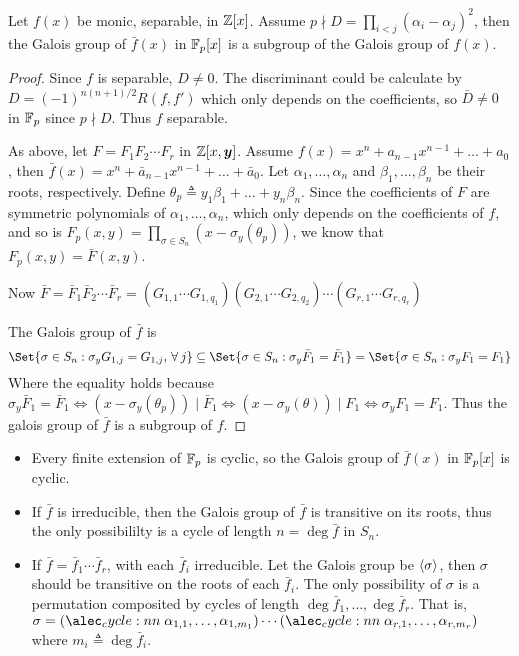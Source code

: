 \begin{theorem}
  Let $f(x)$ be monic, separable, in $\mathbb{Z}[x]$. Assume $p \nmid D = \prod_{i < j} (\alpha_i - \alpha_j)^2$,
  then the Galois group of $\bar{f}(x)$ in $\mathbb{F}_p[x]$ is a subgroup of the Galois group of $f(x)$.

  \begin{proof}
    Since $f$ is separable, $D \neq 0$. The discriminant could be calculate
    by $D = (-1)^{n(n+1)/2} R(f, f')$ which only depends on the coefficients,
    so $\bar{D} \neq 0$ in $\mathbb{F}_p$ since $p \nmid D$. Thus $f$ separable.

    As above, let $F = F_1 F_2 \dotsm F_r$ in $\mathbb{Z}[x, \bm{y}]$.
    Assume $f(x) = x^n + a_{n-1} x^{n-1} + \dots + a_0$, then $\bar{f}(x) =
    x^n + \bar{a}_{n-1}x^{n-1} + \dots + \bar{a}_0$.  Let $\alpha_1, \dots, \alpha_n$
    and $\beta_1, \dots, \beta_n$ be their roots, respectively.
    Define $\theta_p \triangleq y_1 \beta_1 + \dots + y_n \beta_n$.
    Since the coefficients of $F$ are symmetric polynomials of
    $\alpha_1, \dots, \alpha_n$, which only depends on the coefficients of $f$,
    and so is $F_p(x, y) = \prod_{\sigma \in S_n}(x - \sigma_y(\theta_p))$,
    we know that $F_p(x, y) = \bar{F}(x, y)$.

    Now $\bar{F} = \bar{F}_1 \bar{F}_2 \dotsm \bar{F}_r
    = (G_{1, 1} \dotsm G_{1, q_1})(G_{2, 1} \dotsm G_{2, q_2}) \dotsm (G_{r, 1}
    \dotsm G_{r, q_r})$

    The Galois group of $\bar{f}$ is
    \[ \Set{ \sigma \in S_n : \sigma_y G_{1, j} = G_{1, j}, \, \forall j }
      \subseteq \Set{ \sigma \in S_n : \sigma_y \bar{F}_1 = \bar{F}_1 } =
    \Set{\sigma \in S_n : \sigma_y F_1 = F_1} \]
    Where the equality holds because $\sigma_y \bar{F}_1 = \bar{F}_1 \iff
    (x - \sigma_y(\theta_p)) \mid \bar{F}_1 \iff
    (x - \sigma_y(\theta)) \mid F_1 \iff \sigma_y F_1 = F_1$. Thus the galois group
    of $\bar{f}$ is a subgroup of $f$.
  \end{proof}
\end{theorem}

\begin{fact} \hfill
  \begin{itemize}
    \item Every finite extension of $\mathbb{F}_p$ is cyclic, so the Galois group of
      $\bar{f}(x)$ in $\mathbb{F}_p[x]$ is cyclic.
    \item If $\bar{f}$ is irreducible, then the Galois group of $\bar{f}$ is
      transitive on its roots, thus the only possibililty is a cycle of length
      $n = \deg \bar{f}$ in $S_n$.
    \item If $\bar{f} = \bar{f}_1 \dotsm \bar{f}_r$, with each $\bar{f}_i$ irreducible.
      Let the Galois group be $\langle\sigma\rangle$, then $\sigma$ should be
      transitive on the roots of each $\bar{f}_i$. The only possibility of $\sigma$
      is a permutation composited by cycles of length
      $\deg \bar{f}_1, \dots, \deg \bar{f}_r$.
      That is, $\sigma = \cycle{\alpha_{1,1}, \dots, \alpha_{1, m_1}} \dotsm
      \cycle{\alpha_{r,1}, \dots, \alpha_{r, m_r}}$ where $m_i \triangleq
      \deg \bar{f}_i$.
  \end{itemize}
\end{fact}
